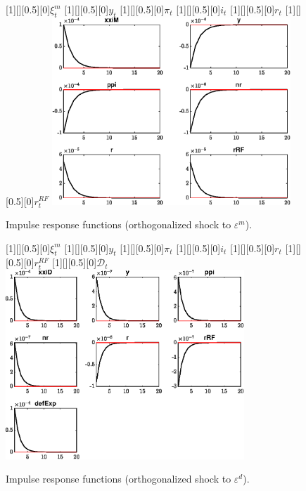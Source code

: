  
\begin{figure}[H]
[1][][0.5][0]{$\xi^m_t$}
[1][][0.5][0]{$y_t$}
[1][][0.5][0]{$\pi_t$}
[1][][0.5][0]{$i_t$}
[1][][0.5][0]{$r_t$}
[1][][0.5][0]{$r^{RF}_t$}
\centering 
\includegraphics[width=0.80\textwidth]{risky_ClosedEconomy/graphs/risky_ClosedEconomy_IRF_eepsM}
\caption{Impulse response functions (orthogonalized shock to ${\varepsilon^{m}}$).}
\label{Fig:IRF:eepsM}
\end{figure}
 
\begin{figure}[H]
[1][][0.5][0]{$\xi^m_t$}
[1][][0.5][0]{$y_t$}
[1][][0.5][0]{$\pi_t$}
[1][][0.5][0]{$i_t$}
[1][][0.5][0]{$r_t$}
[1][][0.5][0]{$r^{RF}_t$}
[1][][0.5][0]{$\mathcal{D}_t$}
\centering 
\includegraphics[width=0.80\textwidth]{risky_ClosedEconomy/graphs/risky_ClosedEconomy_IRF_eepsD}
\caption{Impulse response functions (orthogonalized shock to ${\varepsilon^{d}}$).}
\label{Fig:IRF:eepsD}
\end{figure}
 
